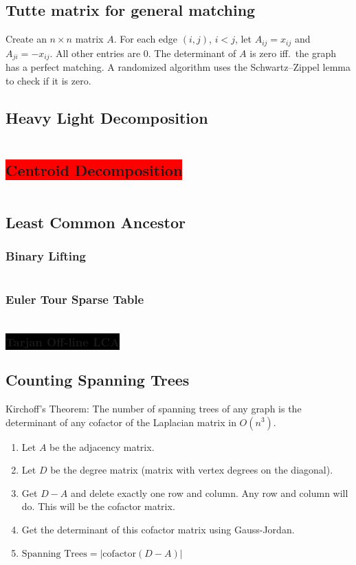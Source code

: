\documentclass[8pt,a4paper,landscape,oneside]{amsart}
\newcommand{\code}[1]{\inputminted[fontsize=\normalsize,baselinestretch=1]{cpp}{_code/#1}}
\newcommand{\subsectionRed}[1]{\subsection{\colorbox{red}{\color{white}#1}}}
\newcommand{\subsubsectionBlack}[1]{\subsubsection{\colorbox{black}{\color{white}#1}}}
\begin{document}
\begin{multicols*}{3}
  \subsection{Tutte matrix for general matching}
    Create an $n\times n$ matrix $A$. For each edge $(i,j)$, $i<j$, let
    $A_{ij} = x_{ij}$ and $A_{ji} = -x_{ij}$. All other entries are $0$.
    The determinant of $A$ is zero iff.\ the graph has a perfect matching.
    A randomized algorithm uses the Schwartz--Zippel lemma to check if it is
    zero.
  \subsection{Heavy Light Decomposition}
    \code{graphs/heavy_light_decomposition.cpp}
	\subsectionRed{Centroid Decomposition}
    \code{graphs/centroid_decomposition.cpp}
	\subsection{Least Common Ancestor}
		\subsubsection{Binary Lifting}
      \code{graphs/lca/binary_lifting.cpp}
    \subsubsection{Euler Tour Sparse Table}
      \code{graphs/lca/lca_sparse_table.cpp}
    \subsubsectionBlack{Tarjan Off-line LCA}
  \subsection{Counting Spanning Trees}
    Kirchoff's Theorem: The number of spanning trees of any graph is the
    determinant of any cofactor of the Laplacian matrix in $O(n^3)$.
    \begin{enumerate}
        \item Let $A$ be the adjacency matrix.
        \item Let $D$ be the degree matrix (matrix with vertex degrees on the diagonal).
        \item Get $D-A$ and delete exactly one row and column. Any row and
        column will do. This will be the cofactor matrix.
        \item Get the determinant of this cofactor matrix using Gauss-Jordan.
        \item $\text{Spanning Trees} = \left|\mathrm{cofactor}(D-A) \right|$
    \end{enumerate}

\end{multicols*}
\end{document}
